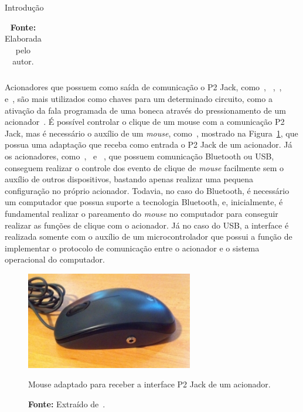 \begin{chapter}{Introdução}
\begin{table}[!h]
\begin{tabular}{ccC{3cm}cC{3cm}}
	\hline
	\hline
\end{tabular}
\vspace{-0.5cm}
\caption*{\textbf{Fonte: }Elaborada pelo autor.}
\end{table}

Acionadores que possuem como saída de comunicação o P2 Jack,
como~\cite{CandyCorn}, ~\cite{JellyBean},~\cite{MicroLight}, ~\cite{HoneyBee}
e~\cite{StringSwitch}, são mais utilizados como chaves para um determinado
circuito, como a ativação da fala programada de uma boneca através do
pressionamento de um acionador~\cite{ATswitchYT}. %
É possível controlar o clique de um mouse com a comunicação P2
Jack, mas é necessário o auxílio de um \textit{mouse}, como~\cite{MouseJack},
mostrado na Figura~\ref{fig:mouse}, que possua uma adaptação que receba como
entrada o P2 Jack de um acionador.  Já os acionadores,
como~\cite{Blue2},~\cite{FootPedal} e ~\cite{SipPuff}, que possuem comunicação
Bluetooth ou USB, conseguem realizar o controle dos evento de clique de
\textit{mouse} facilmente sem o auxílio de outros dispositivos, bastando apenas
realizar uma pequena configuração no próprio acionador. Todavia, no caso do
Bluetooth, é necessário um computador que possua suporte a tecnologia Bluetooth,
e, inicialmente, é fundamental realizar o pareamento do \textit{mouse} no
computador para conseguir realizar as funções de clique com o acionador. Já no
caso do USB, a interface é realizada somente com o auxílio de um
microcontrolador que possui a função de implementar o protocolo de comunicação
entre o acionador e o sistema operacional do computador.

\begin{figure}[!h]
	\centering
	\includegraphics[width=0.65\textwidth]{fig/mouse13}
	\caption{Mouse adaptado para receber a interface P2 Jack de um acionador.}
	\vspace{-1.0cm}
	\caption*{\textbf{Fonte: } Extraído de~\cite{MouseJack}.}
	\label{fig:mouse}
\end{figure}


\end{chapter}
